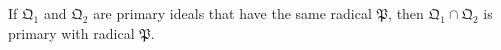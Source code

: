 If $\mathfrak{Q}_1$ and $\mathfrak{Q}_2$ are primary ideals that have the same radical $\mathfrak{P}$, then $\mathfrak{Q}_1 \cap \mathfrak{Q}_2$ is primary with radical $\mathfrak{P}$.
